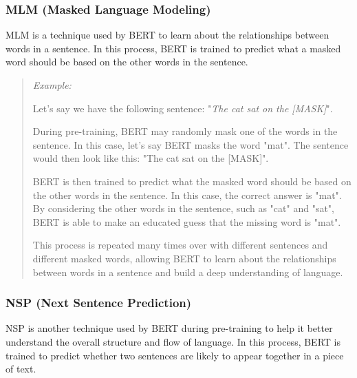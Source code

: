\subsubsection{MLM (Masked Language Modeling)}
MLM is a technique used by BERT to learn about the relationships between words in a sentence. In this process, BERT is trained to predict what a masked word should be based on the other words in the sentence.

\begin{quote}
\textit{Example:}

Let's say we have the following sentence: "\textit{The cat sat on the [MASK]}".

During pre-training, BERT may randomly mask one of the words in the sentence. In this case, let's say BERT masks the word "mat". The sentence would then look like this: "The cat sat on the [MASK]".

BERT is then trained to predict what the masked word should be based on the other words in the sentence. In this case, the correct answer is "mat". By considering the other words in the sentence, such as "cat" and "sat", BERT is able to make an educated guess that the missing word is "mat".

This process is repeated many times over with different sentences and different masked words, allowing BERT to learn about the relationships between words in a sentence and build a deep understanding of language.

\end{quote}

\subsubsection{NSP (Next Sentence Prediction)}
NSP is another technique used by BERT during pre-training to help it better understand the overall structure and flow of language. In this process, BERT is trained to predict whether two sentences are likely to appear together in a piece of text.

